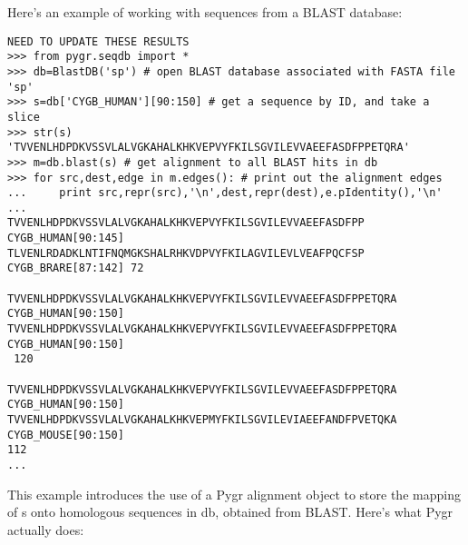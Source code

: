 \documentclass{howto}
\begin{document}
Here's an example of working with sequences from a BLAST database:

\begin{verbatim}
NEED TO UPDATE THESE RESULTS
>>> from pygr.seqdb import *
>>> db=BlastDB('sp') # open BLAST database associated with FASTA file 'sp'
>>> s=db['CYGB_HUMAN'][90:150] # get a sequence by ID, and take a slice
>>> str(s)
'TVVENLHDPDKVSSVLALVGKAHALKHKVEPVYFKILSGVILEVVAEEFASDFPPETQRA'
>>> m=db.blast(s) # get alignment to all BLAST hits in db
>>> for src,dest,edge in m.edges(): # print out the alignment edges
...     print src,repr(src),'\n',dest,repr(dest),e.pIdentity(),'\n'
... 
TVVENLHDPDKVSSVLALVGKAHALKHKVEPVYFKILSGVILEVVAEEFASDFPP CYGB_HUMAN[90:145] 
TLVENLRDADKLNTIFNQMGKSHALRHKVDPVYFKILAGVILEVLVEAFPQCFSP CYGB_BRARE[87:142] 72

TVVENLHDPDKVSSVLALVGKAHALKHKVEPVYFKILSGVILEVVAEEFASDFPPETQRA CYGB_HUMAN[90:150] 
TVVENLHDPDKVSSVLALVGKAHALKHKVEPVYFKILSGVILEVVAEEFASDFPPETQRA CYGB_HUMAN[90:150]
 120

TVVENLHDPDKVSSVLALVGKAHALKHKVEPVYFKILSGVILEVVAEEFASDFPPETQRA CYGB_HUMAN[90:150] 
TVVENLHDPDKVSSVLALVGKAHALKHKVEPMYFKILSGVILEVIAEEFANDFPVETQKA CYGB_MOUSE[90:150]
112 
...
\end{verbatim}

This example introduces the use of a Pygr alignment object to store the mapping of s onto homologous sequences in db, obtained from BLAST.  Here's what Pygr actually does:
\end{document}
